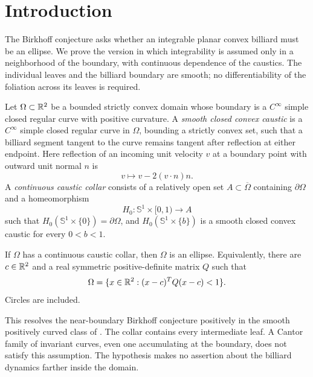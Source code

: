 \section{Introduction}\label{sec:introduction}
\suppressfloats[t]

The Birkhoff conjecture asks whether an integrable planar convex billiard
must be an ellipse. We prove the version in which integrability is assumed
only in a neighborhood of the boundary, with continuous dependence of the
caustics. The individual leaves and the billiard boundary are smooth;
no differentiability of the foliation across its leaves is required.

\begin{definition}\label{def:caustic-collar}
Let \(\Omega\subset\mathbb R^2\) be a bounded strictly convex domain whose boundary
is a \(C^\infty\) simple closed regular curve with positive curvature.
A \emph{smooth closed convex caustic} is a \(C^\infty\) simple closed
regular curve in \(\Omega\), bounding a strictly convex set, such that a
billiard segment tangent to the curve remains tangent after reflection
at either endpoint. Here reflection of an incoming unit velocity \(v\)
at a boundary point with outward unit normal \(n\) is
\[
v\longmapsto v-2(v\cdot n)n.
\]
A \emph{continuous caustic collar} consists of a relatively open set
\(A\subset\overline\Omega\) containing \(\partial\Omega\) and a homeomorphism
\[
H_0:\mathbb S^1\times[0,1)\longrightarrow A
\]
such that \(H_0(\mathbb S^1\times\{0\})=\partial\Omega\), and
\(H_0(\mathbb S^1\times\{b\})\) is a smooth closed convex caustic for every
\(0<b<1\).
\end{definition}

\begin{theorem}\label{thm:main}
If \(\Omega\) has a continuous caustic collar, then \(\Omega\) is an ellipse.
Equivalently, there are \(c\in\mathbb R^2\) and a real symmetric positive-definite
matrix \(Q\) such that
\[
\Omega=\{x\in\mathbb R^2:(x-c)^TQ(x-c)<1\}.
\]
Circles are included.
\end{theorem}

This resolves the near-boundary Birkhoff conjecture positively in the
smooth positively curved class of . The collar
contains every intermediate leaf. A Cantor family of invariant curves,
even one accumulating at the boundary, does not satisfy this assumption.
The hypothesis makes no assertion about the billiard dynamics farther
inside the domain.



